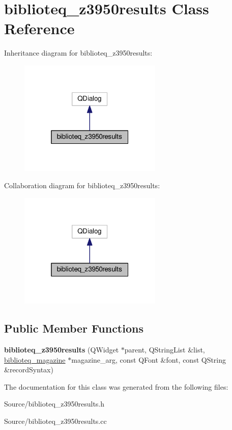 \hypertarget{classbiblioteq__z3950results}{}\section{biblioteq\+\_\+z3950results Class Reference}
\label{classbiblioteq__z3950results}


Inheritance diagram for biblioteq\+\_\+z3950results\+:
\nopagebreak
\begin{figure}[H]
\begin{center}
\leavevmode
\includegraphics[width=193pt]{classbiblioteq__z3950results__inherit__graph}
\end{center}
\end{figure}


Collaboration diagram for biblioteq\+\_\+z3950results\+:
\nopagebreak
\begin{figure}[H]
\begin{center}
\leavevmode
\includegraphics[width=193pt]{classbiblioteq__z3950results__coll__graph}
\end{center}
\end{figure}
\subsection*{Public Member Functions}
\begin{DoxyCompactItemize}
\item 
{\bfseries biblioteq\+\_\+z3950results} (Q\+Widget $\ast$parent, Q\+String\+List \&list, \hyperlink{classbiblioteq__magazine}{biblioteq\+\_\+magazine} $\ast$magazine\+\_\+arg, const Q\+Font \&font, const Q\+String \&record\+Syntax)\hypertarget{classbiblioteq__z3950results_a74c0325525d70d87c41a43de748b8e23}{}\label{classbiblioteq__z3950results_a74c0325525d70d87c41a43de748b8e23}

\end{DoxyCompactItemize}


The documentation for this class was generated from the following files\+:\begin{DoxyCompactItemize}
\item 
Source/biblioteq\+\_\+z3950results.\+h\item 
Source/biblioteq\+\_\+z3950results.\+cc\end{DoxyCompactItemize}
